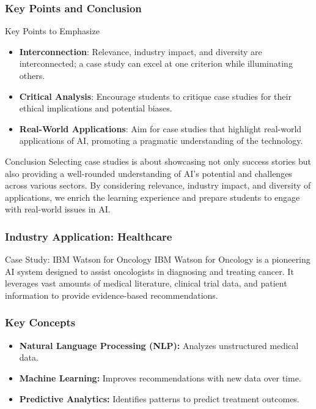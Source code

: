\documentclass{beamer}
\begin{document}
\begin{frame}[fragile]
    \frametitle{Key Points and Conclusion}
    \begin{block}{Key Points to Emphasize}
        \begin{itemize}
            \item \textbf{Interconnection}: Relevance, industry impact, and diversity are interconnected; a case study can excel at one criterion while illuminating others.
            \item \textbf{Critical Analysis}: Encourage students to critique case studies for their ethical implications and potential biases.
            \item \textbf{Real-World Applications}: Aim for case studies that highlight real-world applications of AI, promoting a pragmatic understanding of the technology.
        \end{itemize}
    \end{block}
    \begin{block}{Conclusion}
        Selecting case studies is about showcasing not only success stories but also providing a well-rounded understanding of AI's potential and challenges across various sectors. 
        By considering relevance, industry impact, and diversity of applications, we enrich the learning experience and prepare students to engage with real-world issues in AI.
    \end{block}
\end{frame}

\begin{frame}[fragile]
    \frametitle{Industry Application: Healthcare}
    \begin{block}{Case Study: IBM Watson for Oncology}
        IBM Watson for Oncology is a pioneering AI system designed to assist oncologists in diagnosing and treating cancer. It leverages vast amounts of medical literature, clinical trial data, and patient information to provide evidence-based recommendations.
    \end{block}
\end{frame}

\begin{frame}[fragile]
    \frametitle{Key Concepts}
    \begin{itemize}
        \item \textbf{Natural Language Processing (NLP):} Analyzes unstructured medical data.
        \item \textbf{Machine Learning:} Improves recommendations with new data over time.
        \item \textbf{Predictive Analytics:} Identifies patterns to predict treatment outcomes.
    \end{itemize}
\end{frame}
\end{document}
